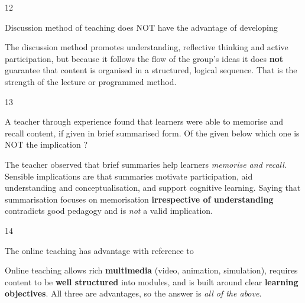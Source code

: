 \begin{question}{12}
{Discussion method of teaching does NOT have the advantage of developing\par}
\begin{explain}
The discussion method promotes understanding, reflective thinking and active participation, but because it follows the flow of the group's ideas it does \textbf{not} guarantee that content is organised in a structured, logical sequence. That is the strength of the lecture or programmed method.
\end{explain}
\end{question}

\begin{question}{13}
{A teacher through experience found that learners were able to memorise and recall content, if given in brief summarised form. Of the given below which one is NOT the implication ?\par}
\begin{explain}
The teacher observed that brief summaries help learners \emph{memorise and recall}. Sensible implications are that summaries motivate participation, aid understanding and conceptualisation, and support cognitive learning. Saying that summarisation focuses on memorisation \textbf{irrespective of understanding} contradicts good pedagogy and is \emph{not} a valid implication.
\end{explain}
\end{question}

\begin{question}{14}
{The online teaching has advantage with reference to\par}
\begin{explain}
Online teaching allows rich \textbf{multimedia} (video, animation, simulation), requires content to be \textbf{well structured} into modules, and is built around clear \textbf{learning objectives}. All three are advantages, so the answer is \emph{all of the above}.
\end{explain}
\end{question}

